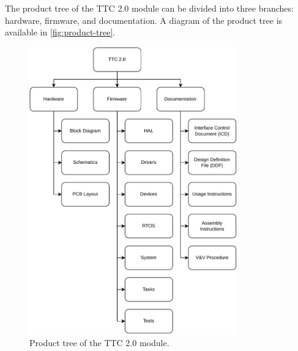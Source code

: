 The product tree of the TTC 2.0 module can be divided into three branches: hardware, firmware, and documentation. A diagram of the product tree is available in \autoref{fig:product-tree}.

\begin{figure}[!ht]
    \begin{center}
        \includegraphics[width=0.8\textwidth]{figures/product-tree.pdf}
        \caption{Product tree of the TTC 2.0 module.}
        \label{fig:product-tree}
    \end{center}
\end{figure}

